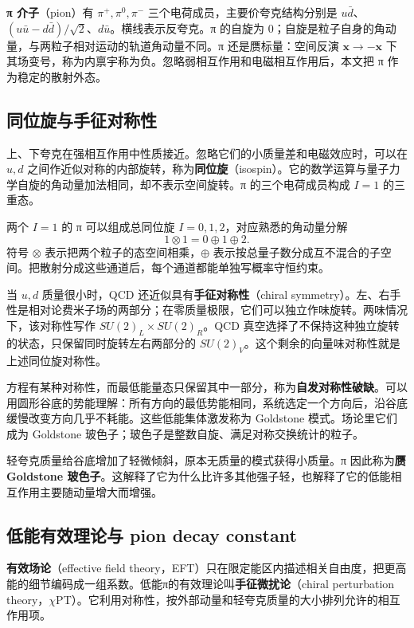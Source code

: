 \documentclass[UTF8,a4paper,11pt,fontset=fandol]{ctexart}
\numberwithin{equation}{section}
\begin{document}
\textbf{π 介子}（pion）有 \(\pi^+,\pi^0,\pi^-\) 三个电荷成员，主要价夸克结构分别是 \(u\bar d\)、\((u\bar u-d\bar d)/\sqrt2\)、\(d\bar u\)。横线表示反夸克。π 的自旋为 0；自旋是粒子自身的角动量，与两粒子相对运动的轨道角动量不同。π 还是赝标量：空间反演 \(\boldsymbol x\to-\boldsymbol x\) 下其场变号，称为内禀宇称为负。忽略弱相互作用和电磁相互作用后，本文把 π 作为稳定的散射外态。

\subsection{同位旋与手征对称性}
上、下夸克在强相互作用中性质接近。忽略它们的小质量差和电磁效应时，可以在 \(u,d\) 之间作近似对称的内部旋转，称为\textbf{同位旋}（isospin）。它的数学运算与量子力学自旋的角动量加法相同，却不表示空间旋转。π 的三个电荷成员构成 \(I=1\) 的三重态。

两个 \(I=1\) 的 π 可以组成总同位旋 \(I=0,1,2\)，对应熟悉的角动量分解
\begin{equation}
1\otimes1=0\oplus1\oplus2.
\end{equation}
符号 \(\otimes\) 表示把两个粒子的态空间相乘，\(\oplus\) 表示按总量子数分成互不混合的子空间。把散射分成这些通道后，每个通道都能单独写概率守恒约束。

当 \(u,d\) 质量很小时，QCD 还近似具有\textbf{手征对称性}（chiral symmetry）。左、右手性是相对论费米子场的两部分；在零质量极限，它们可以独立作味旋转。两味情况下，该对称性写作 \(SU(2)_L\times SU(2)_R\)。QCD 真空选择了不保持这种独立旋转的状态，只保留同时旋转左右两部分的 \(SU(2)_V\)。这个剩余的向量味对称性就是上述同位旋对称性。

方程有某种对称性，而最低能量态只保留其中一部分，称为\textbf{自发对称性破缺}。可以用圆形谷底的势能理解：所有方向的最低势能相同，系统选定一个方向后，沿谷底缓慢改变方向几乎不耗能。这些低能集体激发称为 Goldstone 模式。场论里它们成为 Goldstone 玻色子；玻色子是整数自旋、满足对称交换统计的粒子。

轻夸克质量给谷底增加了轻微倾斜，原本无质量的模式获得小质量。π 因此称为\textbf{赝 Goldstone 玻色子}。这解释了它为什么比许多其他强子轻，也解释了它的低能相互作用主要随动量增大而增强。

\subsection{低能有效理论与 pion decay constant}
\textbf{有效场论}（effective field theory，EFT）只在限定能区内描述相关自由度，把更高能的细节编码成一组系数。低能π的有效理论叫\textbf{手征微扰论}（chiral perturbation theory，\(\chi\)PT）。它利用对称性，按外部动量和轻夸克质量的大小排列允许的相互作用项。
\end{document}
